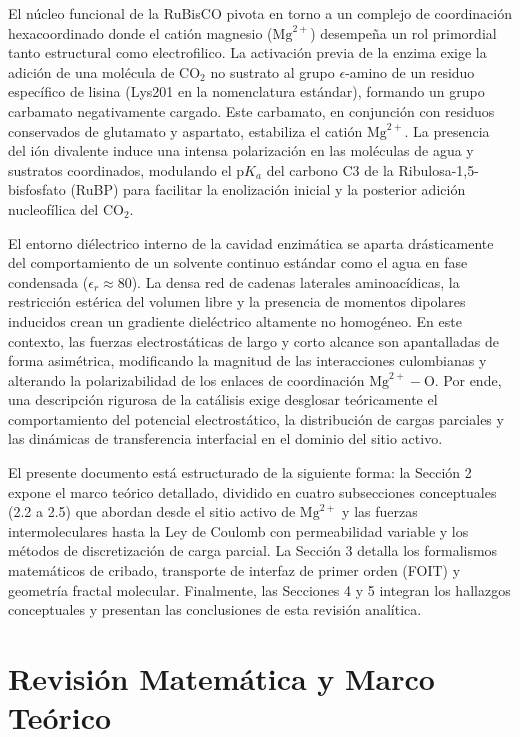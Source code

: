 \documentclass[12pt]{article}
\begin{document}
El núcleo funcional de la RuBisCO pivota en torno a un complejo de coordinación hexacoordinado donde el catión magnesio ($\text{Mg}^{2+}$) desempeña un rol primordial tanto estructural como electrofilico. La activación previa de la enzima exige la adición de una molécula de $\text{CO}_2$ no sustrato al grupo $\epsilon$-amino de un residuo específico de lisina (Lys201 en la nomenclatura estándar), formando un grupo carbamato negativamente cargado. Este carbamato, en conjunción con residuos conservados de glutamato y aspartato, estabiliza el catión $\text{Mg}^{2+}$. La presencia del ión divalente induce una intensa polarización en las moléculas de agua y sustratos coordinados, modulando el $\text{p}K_a$ del carbono C3 de la Ribulosa-1,5-bisfosfato (RuBP) para facilitar la enolización inicial y la posterior adición nucleofílica del $\text{CO}_2$.

El entorno diélectrico interno de la cavidad enzimática se aparta drásticamente del comportamiento de un solvente continuo estándar como el agua en fase condensada ($\epsilon_r \approx 80$). La densa red de cadenas laterales aminoacídicas, la restricción estérica del volumen libre y la presencia de momentos dipolares inducidos crean un gradiente dieléctrico altamente no homogéneo. En este contexto, las fuerzas electrostáticas de largo y corto alcance son apantalladas de forma asimétrica, modificando la magnitud de las interacciones culombianas y alterando la polarizabilidad de los enlaces de coordinación $\text{Mg}^{2+}-\text{O}$. Por ende, una descripción rigurosa de la catálisis exige desglosar teóricamente el comportamiento del potencial electrostático, la distribución de cargas parciales y las dinámicas de transferencia interfacial en el dominio del sitio activo.

El presente documento está estructurado de la siguiente forma: la Sección 2 expone el marco teórico detallado, dividido en cuatro subsecciones conceptuales (2.2 a 2.5) que abordan desde el sitio activo de $\text{Mg}^{2+}$ y las fuerzas intermoleculares hasta la Ley de Coulomb con permeabilidad variable y los métodos de discretización de carga parcial. La Sección 3 detalla los formalismos matemáticos de cribado, transporte de interfaz de primer orden (FOIT) y geometría fractal molecular. Finalmente, las Secciones 4 y 5 integran los hallazgos conceptuales y presentan las conclusiones de esta revisión analítica.

\section{Revisión Matemática y Marco Teórico}
\end{document}
